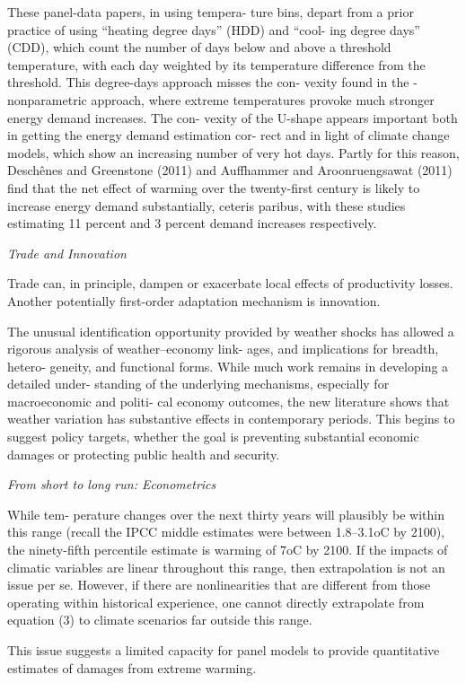 \documentclass[
]{book}
\begin{document}
These panel-data papers, in using tempera-
ture bins, depart from a prior practice of using
``heating degree days'' (HDD) and ``cool-
ing degree days'' (CDD), which count the
number of days below and above a threshold
temperature, with each day weighted by its
temperature difference from the threshold.
This degree-days approach misses the con-
vexity found in the ­nonparametric approach,
where extreme temperatures provoke much
stronger energy demand increases. The con-
vexity of the U-shape appears important both
in getting the energy demand estimation cor-
rect and in light of climate change models,
which show an increasing number of very
hot days. Partly for this reason, Deschênes
and Greenstone (2011) and Auffhammer
and Aroonruengsawat (2011) find that the
net effect of warming over the twenty-first
century is likely to increase energy demand
substantially, ceteris paribus, with these
studies estimating 11 percent and 3 percent
demand increases respectively.

\emph{Trade and Innovation}

Trade can, in principle, dampen or exacerbate local
effects of productivity losses.
Another potentially first-order adaptation
mechanism is innovation.

The unusual identification opportunity
provided by weather shocks has allowed a
rigorous analysis of weather--economy link-
ages, and implications for breadth, hetero-
geneity, and functional forms. While much
work remains in developing a detailed under-
standing of the underlying mechanisms,
especially for macroeconomic and politi-
cal economy outcomes, the new literature
shows that weather variation has substantive
effects in contemporary periods. This begins
to suggest policy targets, whether the goal is
preventing substantial economic damages or
protecting public health and security.

\emph{From short to long run: Econometrics}

While tem-
perature changes over the next thirty years
will plausibly be within this range (recall
the IPCC middle estimates were between
1.8--3.1oC by 2100), the ninety-fifth percentile
estimate is warming of 7oC by 2100. If
the impacts of climatic variables are linear
throughout this range, then extrapolation
is not an issue per se. However, if there are
nonlinearities that are different from those
operating within historical experience, one
cannot directly extrapolate from equation (3)
to climate scenarios far outside this range.

This issue suggests a limited capacity for
panel models to provide quantitative estimates
of damages from extreme warming.
\end{document}
